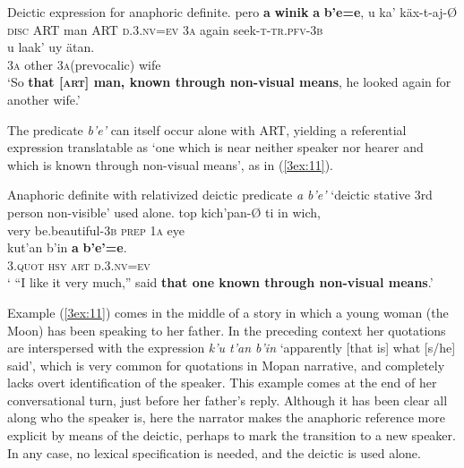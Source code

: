 \documentclass[output=paper]{langsci/langscibook}
\begin{document}
\begin{exe}
\ex\label{3ex:10}
Deictic expression for anaphoric definite. 
\exi{}
\gll	pero 		{\textbf{a}} 	{\textbf{winik}}		{\textbf{a}} 	{\textbf{b'e=e}}, 			u 		ka'		k\"ax-t-aj-\O \\
	{\textsc{disc}}	ART	man	ART	{\textsc{d.3.nv=ev}}		{\textsc{3a}}	again	seek-{\textsc{t-tr.pfv-3b}} \\
\glt
\exi{}
\gll	u 		laak' 		uy					\"atan. \\
	3{\textsc{a}}	other		3{\textsc{a}}(prevocalic)		wife \\
\glt	`So {\textbf{that [{\textsc{art}}] man, known through non-visual means}}, he looked again for another wife.'
\end{exe}

The predicate {\emph{b'e'}} can itself occur alone with ART, yielding a referential expression translatable as `one which is near neither speaker nor hearer and which is known through non-visual means', as in (\ref{3ex:11}).

\begin{exe}
\ex\label{3ex:11}
Anaphoric definite with relativized deictic predicate {\emph{a b'e'}} `deictic stative 3rd person non-visible' used alone. 
\exi{}
\gll	top 		kich'pan-{\O} 			ti			in 		wich, \\
	very		be.beautiful-3{\textsc{b}}		{\textsc{prep}}		1{\textsc{a}}	eye \\
\glt
\exi{}
\gll	kut'an		b'in	 	{\textbf{a}} 	{\textbf{b'e'=e}}. \\
	3.{\textsc{quot}}	{\textsc{hsy}}	{\textsc{art}}	{\textsc{d}}.3.{\textsc{nv=ev}} \\
\glt	` ``I like it very much,'' said {\textbf{that one known through non-visual means}}.'
\end{exe}

Example (\ref{3ex:11}) comes in the middle of a story in which a young woman (the Moon) has been speaking to her father.  In the preceding context her quotations are interspersed with the expression {\emph{k'u t'an b'in}} `apparently [that is] what [s/he] said', which is very common for quotations in Mopan narrative, and completely lacks overt identification of the speaker.  This example comes at the end of her conversational turn, just before her father's reply.  Although it has been clear all along who the speaker is, here the narrator makes the anaphoric reference more explicit by means of the deictic, perhaps to mark the transition to a new speaker.  In any case, no lexical specification is needed, and the deictic is used alone. 
\end{document}
